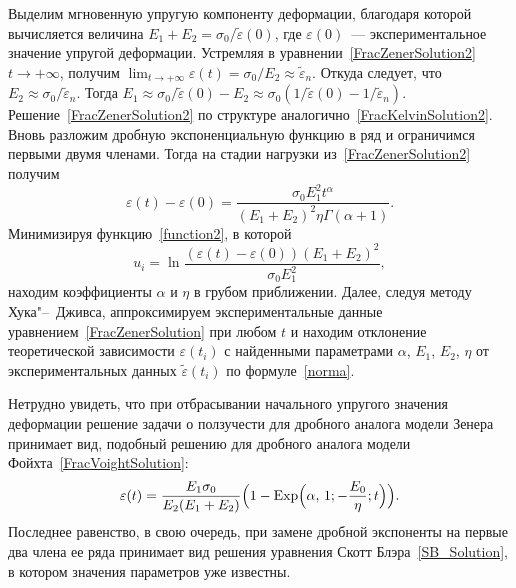 Выделим  мгновенную упругую компоненту деформации, благодаря которой вычисляется величина $E_{1}+E_{2}=\sigma_{0}/\tilde{\varepsilon}(0)$, где $\varepsilon(0)$~--- экспериментальное значение упругой деформации. Устремляя в уравнении~\eqref{FracZenerSolution2} $t\to+\infty$, получим $\lim_{t\to+\infty}\varepsilon(t)=\sigma_{0}/E_{2}\approx\tilde{\varepsilon}_{n}$. Откуда следует, что $E_{2}\approx\sigma_{0}/\tilde{\varepsilon}_{n}$. Тогда  $E_{1}\approx \sigma_{0}/\tilde{\varepsilon}(0)-E_{2}\approx \sigma_{0}(1/\tilde{\varepsilon}(0)-1/\tilde{\varepsilon}_{n})$.
Решение~\eqref{FracZenerSolution2} по структуре аналогично~\eqref{FracKelvinSolution2}. Вновь разложим дробную экспоненциальную функцию в ряд и ограничимся первыми двумя членами. Тогда на стадии нагрузки из~\eqref{FracZenerSolution2} получим
\begin{equation*}
\varepsilon(t)-\varepsilon(0)=\frac{\sigma_{0}E_{1}^{2}t^{\alpha}}{(E_{1}+E_{2})^{2}\eta\Gamma(\alpha+1)}.
\end{equation*}
Минимизируя функцию~\eqref{function2}, в которой
$$
u_{i}=\ln \frac{(\varepsilon(t)-\varepsilon(0))(E_{1}+E_{2})^{2}}{\sigma_{0}E_{1}^{2}},
$$
находим коэффициенты $\alpha$ и $\eta$ в грубом приближении. Далее, следуя методу Хука"--~Дживса, аппроксимируем экспериментальные данные уравнением~\eqref{FracZenerSolution} при любом $t$ и находим отклонение теоретической зависимости $\varepsilon(t_{i})$ с найденными параметрами $\alpha$, $E_{1}$, $E_{2}$, $\eta$ от экспериментальных данных $\tilde{\varepsilon}(t_{i})$ по формуле~\eqref{norma}.

Нетрудно увидеть, что при отбрасывании начального упругого значения деформации решение задачи о ползучести для дробного аналога модели Зенера принимает вид, подобный решению для дробного аналога модели Фойхта~\eqref{FracVoightSolution}:
\begin{equation*}
\varepsilon(t)=\frac{E_{1}\sigma_{0}}{E_{2}(E_{1}+E_{2})}\Bigl(1-{\rm Exp}\Bigl(\alpha,\,1;-\frac{E_{0}}{\eta};t\Bigl)\Bigr).
\end{equation*}
Последнее равенство, в свою очередь, при замене дробной экспоненты на первые два члена ее ряда принимает вид решения уравнения Скотт Блэра~\eqref{SB_Solution}, в котором значения параметров уже известны.

